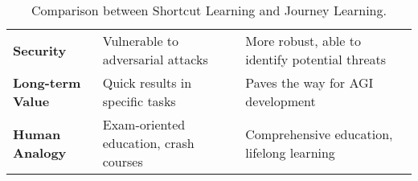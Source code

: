 \begin{table*}[!t]
{{\begin{tabular}[l]{lll}
        \multirow{1}{*}{\textbf{Security}} & Vulnerable to adversarial attacks & More robust, able to identify potential threats \\ 
        \multirow{1}{*}{\textbf{Long-term Value}} & Quick results in specific tasks & Paves the way for AGI development \\ 
        \multirow{1}{*}{\textbf{Human Analogy}} & Exam-oriented education, crash courses & Comprehensive education, lifelong learning \\ 
        \bottomrule
        \end{tabular}
    }
    \caption{Comparison between Shortcut Learning and Journey Learning.}
    \label{tab:comparison}
    }
\end{table*}

